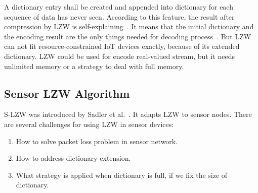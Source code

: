 A dictionary entry shall be created and appended into dictionary for each
sequence of data has never seen. According to this feature, the result after
compression by LZW is self-explaining~\cite{welch1984technique}. It means
that the initial dictionary and the encoding result are the only things
needed for decoding process~\cite{welch1984technique}. But LZW can not fit
resource-constrained IoT devices exactly, because of its extended dictionary.
LZW could be used for encode real-valued stream, but it needs unlimited memory
or a strategy to deal with full memory.

\subsection{Sensor LZW Algorithm}

S-LZW was introduced by Sadler et al.~\cite{sadler2006data}. It adapts LZW to
sensor nodes. There are several challenges for using LZW in sensor devices:
\begin{enumerate}
    \item How to solve packet loss problem in sensor network.
    \item How to address dictionary extension.
    \item What strategy is applied when dictionary is full, if we fix the size
    of dictionary.
\end{enumerate}

